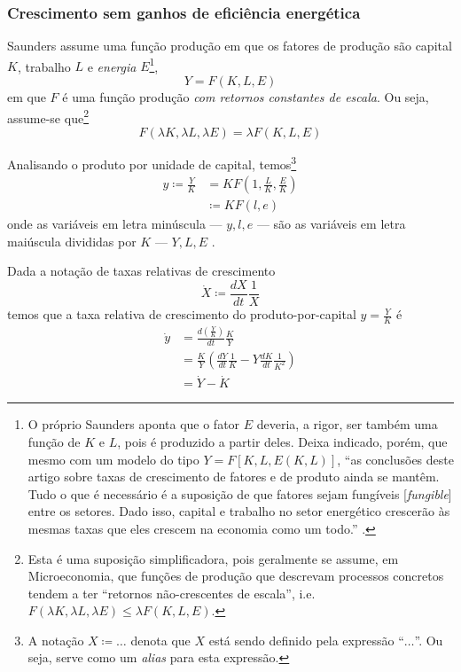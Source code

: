 \subsubsection{Crescimento sem ganhos de eficiência energética}
Saunders assume uma função produção em que os fatores de produção são capital $K$, trabalho $L$ e \textit{energia} $E$\footnote{O próprio Saunders aponta que o fator $E$ deveria, a rigor, ser também uma função de $K$ e $L$, pois é produzido a partir deles. Deixa indicado, porém, que mesmo com um modelo do tipo $Y=F[K, L, E(K,L)]$, ``as conclusões deste artigo sobre taxas de crescimento de fatores e de produto ainda se mantêm. Tudo o que é necessário é a suposição de que fatores sejam fungíveis [\textit{fungible}] entre os setores. Dado isso, capital e trabalho no setor energético crescerão às mesmas taxas que eles crescem na economia como um todo.'' \parencite[p. 144, n.  1]{Saunders1992}.},
$$
Y=F(K, L, E)
$$
em que $F$ é uma função produção \textit{com retornos constantes de escala}. Ou seja, assume-se que\footnote{Esta é uma suposição simplificadora, pois geralmente se assume, em Microeconomia, que funções de produção que descrevam processos concretos tendem a ter ``retornos não-crescentes de escala'', i.e. $F(\lambda K, \lambda L, \lambda E) \leq \lambda F(K, L, E)$.}
$$
F(\lambda K, \lambda L, \lambda E) = \lambda F(K, L, E)
$$

Analisando o produto por unidade de capital, temos\footnote{A notação $X \coloneqq \dots$ denota que $X$ está sendo definido pela expressão ``$\dots$''. Ou seja, serve como um \textit{alias} para esta expressão.}
\begin{align*}
y \coloneqq \frac{Y}{K} &= K F\left( 1, \frac{L}{K}, \frac{E}{K} \right) \\
&\coloneqq K F(l, e)
\end{align*}
onde as variáveis em letra minúscula — $y, l, e$ — são as variáveis em letra maiúscula divididas por $K$ — $Y, L, E$ .

Dada a notação de taxas relativas de crescimento
$$
\dot{X} \coloneqq \frac{dX}{dt} \frac{1}{X}
$$
temos que a taxa relativa de crescimento do produto-por-capital $y=\frac{Y}{K}$ é
\begin{align*}
\dot{y} &= \frac{d\left( \frac{Y}{K} \right)}{dt} \frac{K}{Y} \\
&= \frac{K}{Y} \left( \frac{dY}{dt} \frac{1}{K} - Y \frac{dK}{dt} \frac{1}{K^{2}} \right) \\
&= \dot{Y} - \dot{K}
\end{align*}


